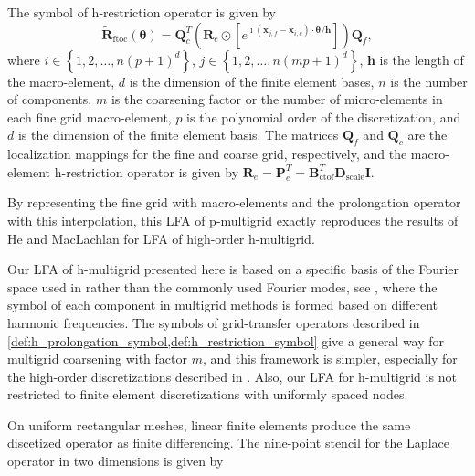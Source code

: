 \documentclass[review]{siamart190516}
\begin{document}
\begin{definition}\label{def:h_restriction_symbol}
The symbol of h-restriction operator is given by
\begin{equation}
\tilde{\mathbf{R}}_{\text{ftoc}} \left( \boldsymbol{\theta} \right) = \mathbf{Q}_c^T \left( \mathbf{R}_e \odot \left[ e^{\imath \left( \mathbf{x}_{j, f} - \mathbf{x}_{i, c} \right) \cdot \boldsymbol{\theta} / \mathbf{h}} \right] \right) \mathbf{Q}_f,
\end{equation}
where $i \in \left\lbrace 1, 2, \dots, n \left( p + 1 \right)^d \right\rbrace$, $j \in \left\lbrace 1, 2, \dots, n \left( m p + 1 \right)^d \right\rbrace$, $\mathbf{h}$ is the length of the macro-element, $d$ is the dimension of the finite element bases, $n$ is the number of components, $m$ is the coarsening factor or the number of micro-elements in each fine grid macro-element, $p$ is the polynomial order of the discretization, and $d$ is the dimension of the finite element basis.
The matrices $\mathbf{Q}_f$ and $\mathbf{Q}_c$ are the localization mappings for the fine and coarse grid, respectively, and the macro-element h-restriction operator is given by $\mathbf{R}_e = \mathbf{P}_e^T = \mathbf{B}_{\text{ctof}}^T \mathbf{D}_{\text{scale}} \mathbf{I}$.
\end{definition}

By representing the fine grid with macro-elements and the prolongation operator with this interpolation, this LFA of p-multigrid exactly reproduces the results of He and MacLachlan \cite{he2020two} for LFA of high-order h-multigrid.

Our LFA of h-multigrid presented here is based on a specific basis of the Fourier space used in \cite{kumar2019local} rather than the commonly used Fourier modes, see \cite{MR1807961, wienands2004practical}, where the symbol of each component in multigrid methods is formed based on different harmonic frequencies.
The symbols of grid-transfer operators described in \cref{def:h_prolongation_symbol,def:h_restriction_symbol} give a general way for multigrid coarsening with factor $m$, and this framework is simpler, especially for the high-order discretizations described in \cite{he2020two}.
Also, our LFA for h-multigrid is not restricted to finite element discretizations with uniformly spaced nodes.

On uniform rectangular meshes, linear finite elements produce the same discetized operator as finite differencing.
The nine-point stencil for the Laplace operator in two dimensions is given by
\end{document}
